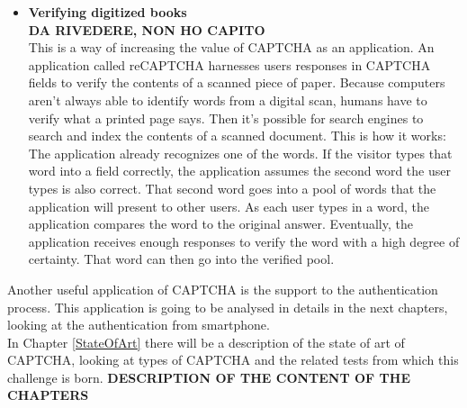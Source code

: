 \begin{itemize}
\item{\textbf{Verifying digitized books}\\
\textbf{DA RIVEDERE, NON HO CAPITO}\\
This is a way of increasing the value of CAPTCHA as an application. An application called reCAPTCHA harnesses users responses in CAPTCHA fields to verify the contents of a scanned piece of paper. Because computers aren't always able to identify words from a digital scan, humans have to verify what a printed page says. Then it's possible for search engines to search and index the contents of a scanned document. This is how it works: The application already recognizes one of the words. If the visitor types that word into a field correctly, the application assumes the second word the user types is also correct. That second word goes into a pool of words that the application will present to other users. As each user types in a word, the application compares the word to the original answer. Eventually, the application receives enough responses to verify the word with a high degree of certainty. That word can then go into the verified pool.
}
\end{itemize}
Another useful application of CAPTCHA is the support to the authentication process. This application is going to be analysed in details in the next chapters, looking at the authentication from smartphone.\\
In Chapter \ref{StateOfArt} there will be a description of the state of art of CAPTCHA, looking at types of CAPTCHA and the related tests from which this challenge is born.
\textbf{DESCRIPTION OF THE CONTENT OF THE CHAPTERS}